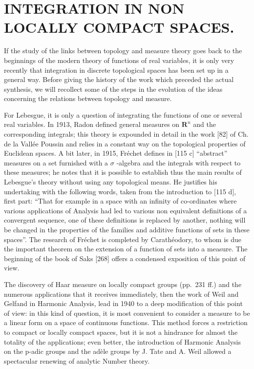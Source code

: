 \chapter{INTEGRATION IN NON LOCALLY COMPACT SPACES.}

If the study of the links between topology and measure theory goes back to the beginnings of the modern theory of functions of real variables, it is only very recently that integration in discrete topological spaces has been set up in a general way. Before giving the history of the work which preceded the actual synthesis, we will recollect some of the steps in the evolution of the ideas concerning the relations between topology and measure.

For Lebesgue, it is only a question of integrating the functions of one or several real variables. In 1913, Radon defined general measures on \(\mathbf{R}^n\) and the corresponding integrals; this theory is expounded in detail in the work {[}82{]} of Ch. de la Vallée Poussin and relies in a constant way on the topological properties of Euclidean spaces. A bit later, in 1915, Fréchet defines in {[}115 c{]} ``abstract'' measures on a set furnished with a \(\sigma\) -algebra and the integrals with respect to these measures; he notes that it is possible to establish thus the main results of Lebesgue's theory without using any topological means. He justifies his undertaking with the following words, taken from the introduction to {[}115 d{]}, first part: ``That for example in a space with an infinity of co-ordinates where various applications of Analysis had led to various non equivalent definitions of a convergent sequence, one of these definitions is replaced by another, nothing will be changed in the properties of the families and additive functions of sets in these spaces''. The research of Fréchet is completed by Carathéodory, to whom is due the important theorem on the extension of a function of sets into a measure. The beginning of the book of Saks {[}268{]} offers a condensed exposition of this point of view.

The discovery of Haar measure on locally compact groups (pp.~231 ff.) and the numerous applications that it receives immediately, then the work of Weil and Gelfand in Harmonic Analysis, lead in 1940 to a deep modification of this point of view: in this kind of question, it is most convenient to consider a measure to be a linear form on a space of continuous functions. This method forces a restriction to compact or locally compact spaces, but it is not a hindrance for almost the totality of the applications; even better, the introduction of Harmonic Analysis on the p-adic groups and the adèle groups by J. Tate and A. Weil allowed a spectacular renewing of analytic Number theory.

